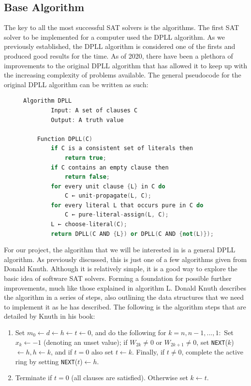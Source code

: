 \documentclass{article}
\begin{document}
\subsection{Base Algorithm}
The key to all the most successful SAT solvers is the algorithms. The first SAT solver to be implemented for a computer used the DPLL algorithm. As we previously established, the DPLL algorithm is considered one of the firsts and produced good results for the time. As of 2020, there have been a plethora of improvements to the original DPLL algorithm that has allowed it to keep up with the increasing complexity of problems available. The general pseudocode for the original DPLL algorithm can be written as such:

\begin{figure}[h]
\begin{lstlisting}[language=C++]
    Algorithm DPLL
        Input: A set of clauses C
        Output: A truth value

    Function DPLL(C)
        if C is a consistent set of literals then
            return true;
        if C contains an empty clause then
            return false;
        for every unit clause {L} in C do
            C ← unit-propagate(L, C);
        for every literal L that occurs pure in C do
            C ← pure-literal-assign(L, C);
        L ← choose-literal(C);
        return DPLL(C AND {L}) or DPLL(C AND {not(L)});
\end{lstlisting}
\end{figure}

For our project, the algorithm that we will be interested in is a general DPLL algorithm. As
previously discussed, this is just one of a few algorithms given from Donald Knuth. Although it is
relatively simple, it is a good way to explore the basic idea of software SAT solvers. Forming a
foundation for possible further improvements, much like those explained in algorithm L. Donald Knuth
describes the algorithm in a series of steps, also outlining the data structures that we need to
implement it as he has described. The following is the algorithm steps that are detailed by Knuth in his book:

\begin{enumerate}
    \item Set $m_0 \leftarrow d \leftarrow h \leftarrow t \leftarrow 0$, and do the following for $k = n, n - 1, ..., 1:$ Set $x_k ← -1$ (denoting an unset value); if $W_{2k} \neq 0$ or $W_{2k+1} \neq 0$, set \texttt{NEXT}($k$) $ \leftarrow h, h \leftarrow k$, and if $t = 0$ also set $t \leftarrow k$. Finally, if $t \neq 0$, complete the active ring by setting \texttt{NEXT}($t$)$ \leftarrow h$.
    \item Terminate if $t = 0$ (all clauses are satisfied). Otherwise set $k \leftarrow t$.
\end{enumerate}
\end{document}
